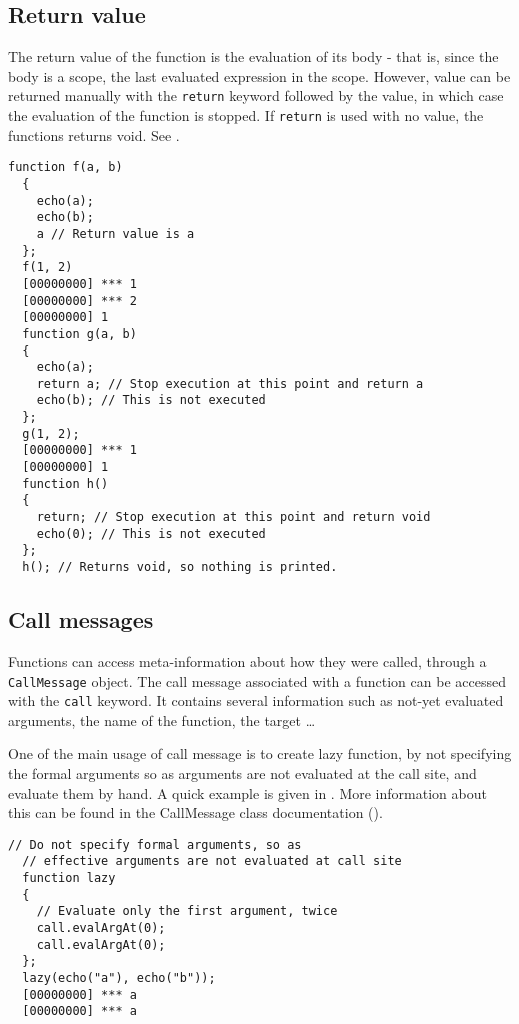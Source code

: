\documentclass[openright,twoside,12pt]{report}
\begin{document}
\subsection{Return value}

The return value of the function is the evaluation of its body - that
is, since the body is a scope, the last evaluated expression in the
scope. However, value can be returned manually with the
\lstinline|return| keyword followed by the value, in which case the
evaluation of the function is stopped. If \lstinline|return| is used
with no value, the functions returns void. See .

\begin{lstlisting}[caption=Returning values from functions,
  label=lst:function-return,float=\floatpos]
  function f(a, b)
  {
    echo(a);
    echo(b);
    a // Return value is a
  };
  f(1, 2)
  [00000000] *** 1
  [00000000] *** 2
  [00000000] 1
  function g(a, b)
  {
    echo(a);
    return a; // Stop execution at this point and return a
    echo(b); // This is not executed
  };
  g(1, 2);
  [00000000] *** 1
  [00000000] 1
  function h()
  {
    return; // Stop execution at this point and return void
    echo(0); // This is not executed
  };
  h(); // Returns void, so nothing is printed.
\end{lstlisting}

\subsection{Call messages}
\label{sect:us-fun-callmsg}

Functions can access meta-information about how they were called,
through a \lstinline|CallMessage| object. The call message associated
with a function can be accessed with the \lstinline|call| keyword. It
contains several information such as not-yet evaluated arguments, the
name of the function, the target \ldots

One of the main usage of call message is to create lazy function, by
not specifying the formal arguments so as arguments are not evaluated
at the call site, and evaluate them by hand. A quick example is given
in . More information about this can be found in
the CallMessage class documentation ().

\begin{lstlisting}[caption=Lazy
  function,label=lst:function-lazy,float=\floatposh]
  // Do not specify formal arguments, so as
  // effective arguments are not evaluated at call site
  function lazy
  {
    // Evaluate only the first argument, twice
    call.evalArgAt(0);
    call.evalArgAt(0);
  };
  lazy(echo("a"), echo("b"));
  [00000000] *** a
  [00000000] *** a
\end{lstlisting}
\end{document}
